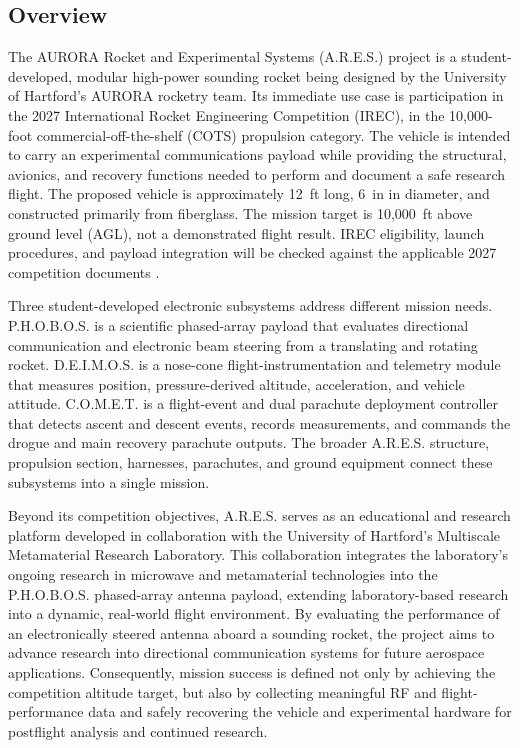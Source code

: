 \documentclass[11pt]{IEEEtran}
\newcommand{\comet}{C.O.M.E.T.}
\newcommand{\ares}{A.R.E.S.}
\newcommand{\phobos}{P.H.O.B.O.S.}
\newcommand{\deimos}{D.E.I.M.O.S.}
\newcommand{\RHeight}{12}
\begin{document}
\subsection{Overview}
The AURORA Rocket and Experimental Systems (\ares{}) project is a student-developed, modular high-power sounding rocket being designed by the University of Hartford's AURORA rocketry team.
Its immediate use case is participation in the 2027 International Rocket Engineering Competition (IREC), in the 10,000-foot commercial-off-the-shelf (COTS) propulsion category.
The vehicle is intended to carry an experimental communications payload while providing the structural, avionics, and recovery functions needed to perform and document a safe research flight.
The proposed vehicle is approximately \RHeight{}~ft long, 6~in in diameter, and constructed primarily from fiberglass.
The mission target is 10,000~ft above ground level (AGL), not a demonstrated flight result.
IREC eligibility, launch procedures, and payload integration will be checked against the applicable 2027 competition documents \cite{irecRules,irecGuide}.

Three student-developed electronic subsystems address different mission needs.
\phobos{} is a scientific phased-array payload that evaluates directional communication and electronic beam steering from a translating and rotating rocket.
\deimos{} is a nose-cone flight-instrumentation and telemetry module that measures position, pressure-derived altitude, acceleration, and vehicle attitude.
\comet{} is a flight-event and dual parachute deployment controller that detects ascent and descent events, records measurements, and commands the drogue and main recovery parachute outputs.
The broader \ares{} structure, propulsion section, harnesses, parachutes, and ground equipment connect these subsystems into a single mission.

Beyond its competition objectives, A.R.E.S. serves as an educational and research platform developed in collaboration with the University of Hartford's Multiscale Metamaterial Research Laboratory.
This collaboration integrates the laboratory's ongoing research in microwave and metamaterial technologies into the P.H.O.B.O.S. phased-array antenna payload, extending laboratory-based research into a dynamic, real-world flight environment.
By evaluating the performance of an electronically steered antenna aboard a sounding rocket, the project aims to advance research into directional communication systems for future aerospace applications.
Consequently, mission success is defined not only by achieving the competition altitude target, but also by collecting meaningful RF and flight-performance data and safely recovering the vehicle and experimental hardware for postflight analysis and continued research.
\end{document}
